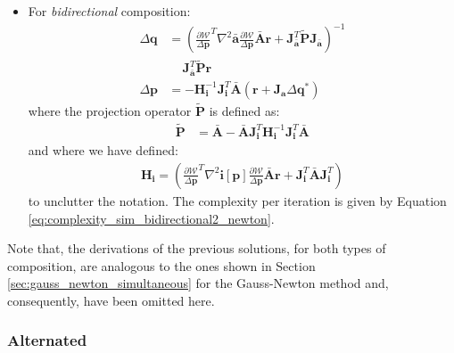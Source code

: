 \begin{itemize}
	\item For \emph{bidirectional} composition:
	\begin{equation}
	    \begin{aligned}
	        \Delta \mathbf{q} & = \left( \frac{\partial \mathcal{W}}{\Delta \mathbf{p}}^T \nabla^2\bar{\mathbf{a}} \frac{\partial \mathcal{W}}{\Delta \mathbf{p}}\bar{\mathbf{A}}\mathbf{r} + \mathbf{J}_{\bar{\mathbf{a}}}^T\tilde{\mathbf{P}}\mathbf{J}_{\bar{\mathbf{a}}}\right)^{-1}
	        \\
	        & \quad \, \mathbf{J}_{\bar{\mathbf{a}}}^T\tilde{\mathbf{P}}\mathbf{r}
	        \\
	        \Delta \mathbf{p} & = -\mathbf{H}_\mathbf{i}^{-1} \mathbf{J}_\mathbf{i}^T \bar{\mathbf{A}} \left( \mathbf{r} + \mathbf{J}_{\mathbf{a}} \Delta\mathbf{q}^* \right)
	    \label{eq:bidirectional_newton_po_solution}
	    \end{aligned}
	\end{equation}
	where the projection operator $\tilde{\mathbf{P}}$ is defined as:
	\begin{equation}
	    \begin{aligned}
			\tilde{\mathbf{P}} &= \bar{\mathbf{A}} - \bar{\mathbf{A}}\mathbf{J}_{\mathbf{i}}^T \mathbf{H}_\mathbf{i}^{-1} \mathbf{J}_{\mathbf{i}}^T\bar{\mathbf{A}}
			\label{eq:bidirectional_projection}
	    \end{aligned}
	\end{equation}
	and where we have defined:
	\begin{equation}
	    \begin{aligned}
			\mathbf{H}_\mathbf{i} = \left( \frac{\partial \mathcal{W}}{\Delta \mathbf{p}}^T \nabla^2\mathbf{i}[\mathbf{p}] \frac{\partial \mathcal{W}}{\Delta \mathbf{p}}\bar{\mathbf{A}}\mathbf{r} + \mathbf{J}_{\mathbf{i}}^T\bar{\mathbf{A}}\mathbf{J}_{\mathbf{i}}^T \right)
	    \end{aligned}
    \end{equation} to unclutter the notation. The complexity per iteration is given by Equation \ref{eq:complexity_sim_bidirectional2_newton}.
\end{itemize}

Note that, the derivations of the previous solutions, for both types of composition, are analogous to the ones shown in Section \ref{sec:gauss_newton_simultaneous} for the Gauss-Newton method and, consequently, have been omitted here.


\subsubsection*{Alternated}
\label{sec:newton_alternated}

